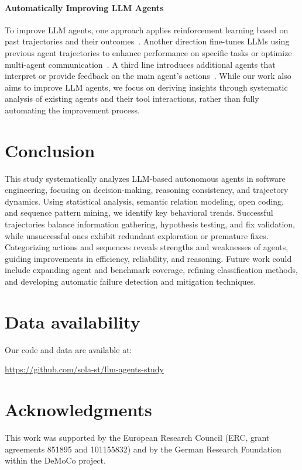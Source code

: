 \documentclass[conference,10pt]{IEEEtran}
\theoremstyle{definition}        %
\begin{document}
\paragraph{Automatically Improving LLM Agents}
To improve LLM agents, one approach applies reinforcement learning based on past trajectories and their outcomes~\cite{Gupta2024,song2024trial,deng2024novice}.
Another direction fine-tunes LLMs using previous agent trajectories to enhance performance on specific tasks or optimize multi-agent communication~\cite{song2024agentbank,chen2024optima}.
A third line introduces additional agents that interpret or provide feedback on the main agent's actions~\cite{Antoniades2024}.
While our work also aims to improve LLM agents, we focus on deriving insights through systematic analysis of existing agents and their tool interactions, rather than fully automating the improvement process.

\section{Conclusion}  

This study systematically analyzes LLM-based autonomous agents in software engineering, focusing on decision-making, reasoning consistency, and trajectory dynamics. Using statistical analysis, semantic relation modeling, open coding, and sequence pattern mining, we identify key behavioral trends. Successful trajectories balance information gathering, hypothesis testing, and fix validation, while unsuccessful ones exhibit redundant exploration or premature fixes. Categorizing actions and sequences reveals strengths and weaknesses of agents, guiding improvements in efficiency, reliability, and reasoning. Future work could include expanding agent and benchmark coverage, refining classification methods, and developing automatic failure detection and mitigation techniques.

\section*{Data availability}
Our code and data are  available at:

 \url{https://github.com/sola-st/llm-agents-study} 

\section*{Acknowledgments}

This work was supported by the European Research Council (ERC, grant agreements 851895 and 101155832) and by the German Research Foundation within the DeMoCo project.


\end{document}
